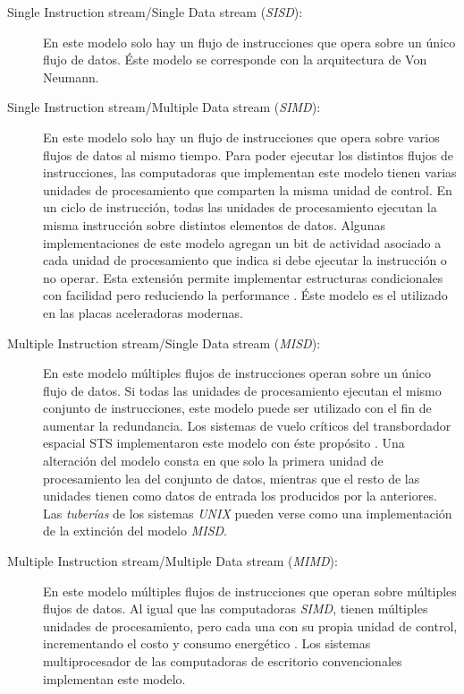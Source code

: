 \begin{description}

	\item[Single Instruction stream/Single Data stream (\emph{SISD}):] En
		este modelo solo hay un flujo de instrucciones que opera sobre
		un único flujo de datos. Éste modelo se corresponde con la
		arquitectura de Von Neumann.

	\item[Single Instruction stream/Multiple Data stream (\emph{SIMD}):] En
		este modelo solo hay un flujo de instrucciones que opera sobre
		varios flujos de datos al mismo tiempo. Para poder ejecutar los
		distintos flujos de instrucciones, las computadoras que
		implementan este modelo tienen varias unidades de procesamiento
		que comparten la misma unidad de control. En un ciclo de
		instrucción, todas las unidades de procesamiento ejecutan la
		misma instrucción sobre distintos elementos de datos. Algunas
		implementaciones de este modelo agregan un bit de actividad
		asociado a cada unidad de procesamiento que indica si debe
		ejecutar la instrucción o no operar. Esta extensión permite
		implementar estructuras condicionales con facilidad pero
		reduciendo la performance \cite{introToPC2002}. Éste modelo es
		el utilizado en las placas aceleradoras modernas.

	\item[Multiple Instruction stream/Single Data stream (\emph{MISD}):] En
		este modelo múltiples flujos de instrucciones operan sobre un
		único flujo de datos. Si todas las unidades de procesamiento
		ejecutan el mismo conjunto de instrucciones, este modelo puede
		ser utilizado con el fin de aumentar la redundancia. Los
		sistemas de vuelo críticos del transbordador espacial STS
		implementaron este modelo con éste propósito
		\cite{spaceShuttlePCS1984}. Una alteración del modelo consta en
		que solo la primera unidad de procesamiento lea del conjunto de
		datos, mientras que el resto de las unidades tienen como datos
		de entrada los producidos por la anteriores. Las \emph{tuberías}
		de los sistemas \emph{UNIX} pueden verse como una implementación
		de la extinción del modelo \emph{MISD}.

	\item[Multiple Instruction stream/Multiple Data stream (\emph{MIMD}):] En
		este modelo múltiples flujos de instrucciones que operan sobre
		múltiples flujos de datos. Al igual que las computadoras
		\emph{SIMD}, tienen múltiples unidades de procesamiento, pero
		cada una con su propia unidad de control, incrementando el costo
		y consumo energético \cite{introToPC2002}. Los sistemas
		multiprocesador de las computadoras de escritorio convencionales
		implementan este modelo.

\end{description}

